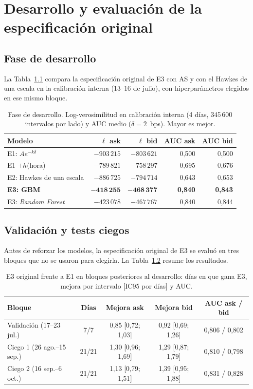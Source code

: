 \chapter{Desarrollo y evaluación de la especificación original}
\label{app:ciegos}

\section{Fase de desarrollo}
La Tabla~\ref{tab:intensidades} compara la especificación original de E3 con AS y con el Hawkes de una escala en la calibración interna (13--16 de julio), con hiperparámetros elegidos en ese mismo bloque.

\begin{table}[htbp]
\centering\small
\caption[Comparación en la fase de desarrollo.]{Fase de desarrollo. Log-verosimilitud en calibración interna (4 días, 345\,600 intervalos por lado) y AUC medio ($\delta=2$~bps). Mayor es mejor.}
\label{tab:intensidades}
\begin{tabular}{@{}lrrrr@{}}\toprule
Modelo & $\ell$ ask & $\ell$ bid & AUC ask & AUC bid\\\midrule
E1: $Ae^{-k\delta}$ & $-903\,215$ & $-803\,621$ & 0,500 & 0,500\\
E1 $+h$(hora) & $-789\,821$ & $-758\,297$ & 0,695 & 0,676\\
E2: Hawkes de una escala & $-886\,725$ & $-794\,714$ & 0,643 & 0,653\\
\textbf{E3: GBM} & $\mathbf{-418\,255}$ & $\mathbf{-468\,377}$ & \textbf{0,840} & \textbf{0,843}\\
E3: \textit{Random Forest} & $-423\,078$ & $-467\,767$ & 0,840 & 0,844\\\bottomrule
\end{tabular}
\end{table}

\section{Validación y tests ciegos}

Antes de reforzar los modelos, la especificación original de E3 se evaluó en tres bloques que no se usaron para elegirla. La Tabla~\ref{tab:ciegos} resume los resultados.

\begin{table}[htbp]
\centering\small
\caption[Evaluación de la especificación original.]{E3 original frente a E1 en bloques posteriores al desarrollo: días en que gana E3, mejora por intervalo [IC95 por días] y AUC.}
\label{tab:ciegos}
\begin{tabular}{@{}lcccc@{}}\toprule
Bloque & Días & Mejora ask & Mejora bid & AUC ask / bid\\\midrule
Validación (17--23 jul.) & 7/7 & 0,85 [0,72; 1,03] & 0,92 [0,69; 1,26] & 0,806 / 0,802\\
Ciego 1 (26 ago.--15 sep.) & 21/21 & 1,30 [0,96; 1,69] & 1,29 [0,87; 1,79] & 0,810 / 0,798\\
Ciego 2 (16 sep.--6 oct.) & 21/21 & 1,13 [0,79; 1,51] & 1,39 [0,95; 1,88] & 0,831 / 0,828\\\bottomrule
\end{tabular}
\end{table}

